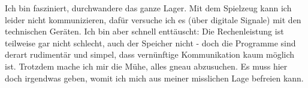 Ich bin fasziniert, durchwandere das ganze Lager. Mit dem Spielzeug kann ich leider nicht kommunizieren, dafür versuche ich es (über digitale Signale) mit den technischen Geräten. Ich bin aber schnell enttäuscht: Die Rechenleistung ist teilweise gar nicht schlecht, auch der Speicher nicht  - doch die Programme sind derart rudimentär und simpel, dass vernünftige Kommunikation kaum möglich ist. Trotzdem mache ich mir die Mühe, alles gneau abzusuchen. Es muss hier doch irgendwas geben, womit ich mich aus meiner misslichen Lage befreien kann.